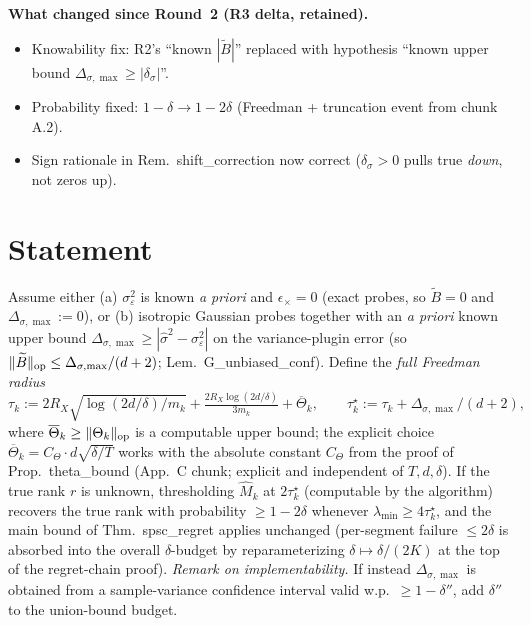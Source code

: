 \textbf{What changed since Round~2 (R3 delta, retained).}
\begin{itemize}[leftmargin=*,itemsep=1pt,topsep=1pt]
\item Knowability fix: R2's ``known $|\widetilde B|$'' replaced with
hypothesis ``known upper bound $\Delta_{\sigma,\max}\ge|\delta_\sigma|$''.
\item Probability fixed: $1-\delta\to 1-2\delta$ (Freedman + truncation
event from chunk A.2).
\item Sign rationale in Rem.\ shift\_correction now correct
($\delta_\sigma>0$ pulls true \emph{down}, not zeros up).
\end{itemize}

\section*{Statement}

\begin{corollary}
\label{cor:rank_adaptive}
Assume either (a) $\sigma_\varepsilon^2$ is known \emph{a priori} and
$\epsilon_\times=0$ (exact probes, so $\widetilde B=0$ and
$\Delta_{\sigma,\max}:=0$), or (b) isotropic Gaussian probes together
with an \emph{a priori} known upper bound
$\Delta_{\sigma,\max}\ge|\hat\sigma^2-\sigma_\varepsilon^2|$ on the
variance-plugin error (so $\|\widetilde B\|_{\mathrm{op}}\le\Delta_{\sigma,\max}/(d+2)$;
Lem.\ G\_unbiased\_conf). Define the \emph{full Freedman radius}
\[
  \tau_k := 2R_X\sqrt{\log(2d/\delta)/m_k}
  + \tfrac{2R_X\log(2d/\delta)}{3m_k}
  + \overline\Theta_k,
  \qquad
  \tau_k^\star := \tau_k + \Delta_{\sigma,\max}/(d+2),
\]
where $\overline\Theta_k\ge\|\Theta_k\|_{\mathrm{op}}$ is a computable upper
bound; the explicit choice $\overline\Theta_k = C_\Theta\cdot d\sqrt{\delta/T}$
works with the absolute constant $C_\Theta$ from the proof of
Prop.\ theta\_bound (App.~C chunk; explicit and independent of $T,d,\delta$). If the true rank $r$ is
unknown, thresholding $\widehat M_k$ at $2\tau_k^\star$ (computable
by the algorithm) recovers the true rank with probability
$\ge 1-2\delta$ whenever $\lambda_{\min}\ge 4\tau_k^\star$, and the
main bound of Thm.\ spsc\_regret applies unchanged (per-segment
failure $\le 2\delta$ is absorbed into the overall $\delta$-budget by
reparameterizing $\delta\mapsto\delta/(2K)$ at the top of the
regret-chain proof). \emph{Remark on implementability.} If instead
$\Delta_{\sigma,\max}$ is obtained from a sample-variance confidence
interval valid w.p.\ $\ge 1-\delta''$, add $\delta''$ to the union-bound
budget.
\end{corollary}

